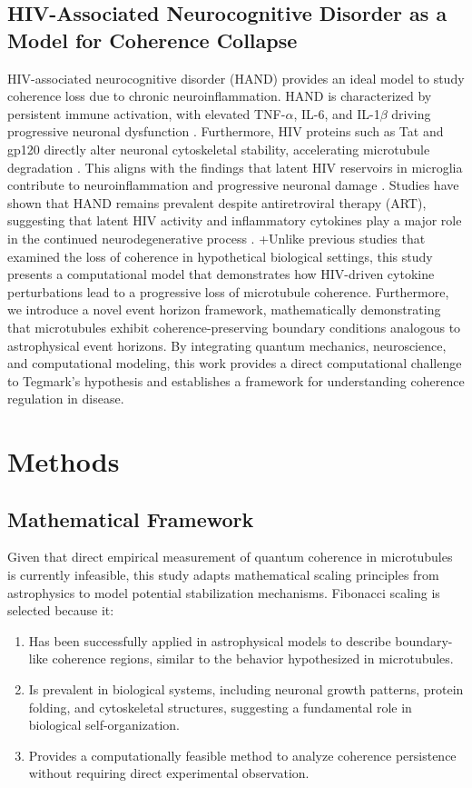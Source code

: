 \documentclass[entropy,article,submit,oneauthor,pdftex]{Definitions/mdpi}
\begin{document}
\subsection{HIV-Associated Neurocognitive Disorder as a Model for Coherence Collapse}
HIV-associated neurocognitive disorder (HAND) provides an ideal model to study coherence loss due to chronic neuroinflammation. HAND is characterized by persistent immune activation, with elevated TNF-$\alpha$, IL-6, and IL-1$\beta$ driving progressive neuronal dysfunction \cite{zhou_development_2025}. Furthermore, HIV proteins such as Tat and gp120 directly alter neuronal cytoskeletal stability, accelerating microtubule degradation \cite{thompson_hiv-associated_2024}. This aligns with the findings that latent HIV reservoirs in microglia contribute to neuroinflammation and progressive neuronal damage \cite{sreeram_potential_2022}. Studies have shown that HAND remains prevalent despite antiretroviral therapy (ART), suggesting that latent HIV activity and inflammatory cytokines play a major role in the continued neurodegenerative process \cite{thompson_hiv-associated_2024}.
+Unlike previous studies that examined the loss of coherence in hypothetical biological settings, this study presents a computational model that demonstrates how HIV-driven cytokine perturbations lead to a progressive loss of microtubule coherence. Furthermore, we introduce a novel event horizon framework, mathematically demonstrating that microtubules exhibit coherence-preserving boundary conditions analogous to astrophysical event horizons. By integrating quantum mechanics, neuroscience, and computational modeling, this work provides a direct computational challenge to Tegmark's hypothesis and establishes a framework for understanding coherence regulation in disease.

\section{Methods}
\subsection{Mathematical Framework}
Given that direct empirical measurement of quantum coherence in microtubules is currently infeasible, this study adapts mathematical scaling principles from astrophysics to model potential stabilization mechanisms. Fibonacci scaling is selected because it:
\begin{enumerate}
    \item Has been successfully applied in astrophysical models to describe boundary-like coherence regions, similar to the behavior hypothesized in microtubules.
    \item Is prevalent in biological systems, including neuronal growth patterns, protein folding, and cytoskeletal structures, suggesting a fundamental role in biological self-organization.
    \item Provides a computationally feasible method to analyze coherence persistence without requiring direct experimental observation.
\end{enumerate}
\end{document}
